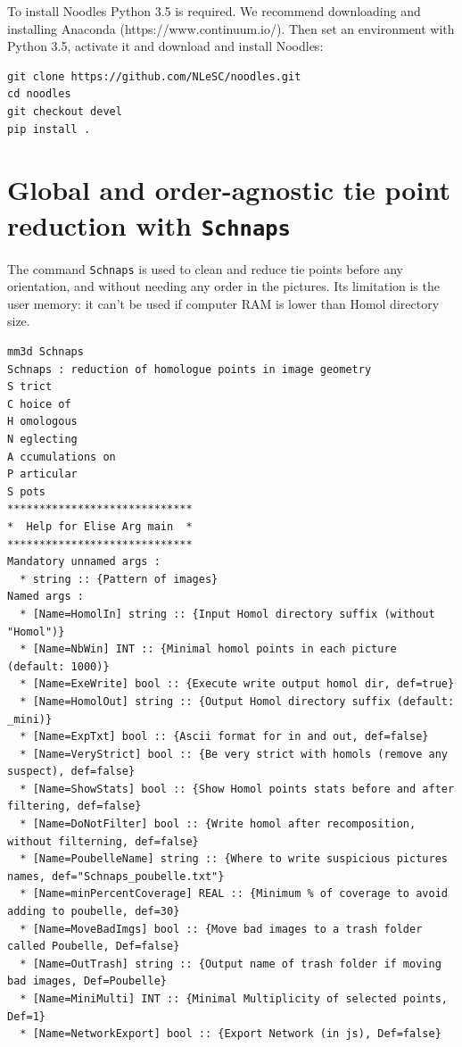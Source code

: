 To install Noodles Python 3.5 is required. We recommend downloading and installing Anaconda (https://www.continuum.io/). Then set an environment with Python 3.5, activate it and download and install Noodles:
\begin{verbatim}
git clone https://github.com/NLeSC/noodles.git
cd noodles
git checkout devel
pip install .
\end{verbatim}


\section{Global and order-agnostic tie point reduction with {\tt Schnaps}}
The command {\tt Schnaps} is used to clean and reduce tie points before any orientation, and without needing any order in the pictures.
Its limitation is the user memory: it can't be used if computer RAM is lower than Homol directory size.

\begin{verbatim}
mm3d Schnaps
Schnaps : reduction of homologue points in image geometry
S trict           
C hoice of        
H omologous       
N eglecting       
A ccumulations on 
P articular       
S pots
*****************************
*  Help for Elise Arg main  *
*****************************
Mandatory unnamed args : 
  * string :: {Pattern of images}
Named args : 
  * [Name=HomolIn] string :: {Input Homol directory suffix (without "Homol")}
  * [Name=NbWin] INT :: {Minimal homol points in each picture (default: 1000)}
  * [Name=ExeWrite] bool :: {Execute write output homol dir, def=true}
  * [Name=HomolOut] string :: {Output Homol directory suffix (default: _mini)}
  * [Name=ExpTxt] bool :: {Ascii format for in and out, def=false}
  * [Name=VeryStrict] bool :: {Be very strict with homols (remove any suspect), def=false}
  * [Name=ShowStats] bool :: {Show Homol points stats before and after filtering, def=false}
  * [Name=DoNotFilter] bool :: {Write homol after recomposition, without filterning, def=false}
  * [Name=PoubelleName] string :: {Where to write suspicious pictures names, def="Schnaps_poubelle.txt"}
  * [Name=minPercentCoverage] REAL :: {Minimum % of coverage to avoid adding to poubelle, def=30}
  * [Name=MoveBadImgs] bool :: {Move bad images to a trash folder called Poubelle, Def=false}
  * [Name=OutTrash] string :: {Output name of trash folder if moving bad images, Def=Poubelle}
  * [Name=MiniMulti] INT :: {Minimal Multiplicity of selected points, Def=1}
  * [Name=NetworkExport] bool :: {Export Network (in js), Def=false}
\end{verbatim}

